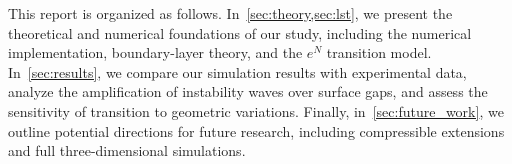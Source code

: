 \documentclass[../main.tex]{subfiles}
\begin{document}
This report is organized as follows. In~\cref{sec:theory,sec:lst}, we present the theoretical and numerical foundations of our study, including the numerical implementation, boundary-layer theory, and the $e^N$ transition model. In~\cref{sec:results}, we compare our simulation results with experimental data, analyze the amplification of instability waves over surface gaps, and assess the sensitivity of transition to geometric variations. Finally, in~\cref{sec:future_work}, we outline potential directions for future research, including compressible extensions and full three-dimensional simulations.
\end{document}
